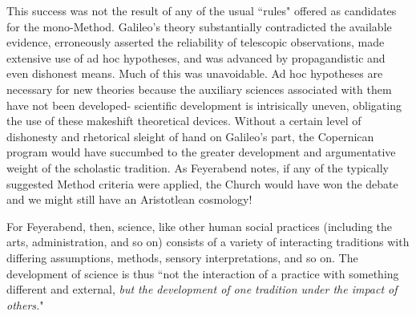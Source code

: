 This success was not the result of any of the usual ``rules" offered as candidates for the mono-Method. Galileo's theory substantially contradicted the available evidence, erroneously asserted the reliability of telescopic observations, made extensive use of ad hoc hypotheses, and was advanced by propagandistic and even dishonest means. Much of this was unavoidable. Ad hoc hypotheses are necessary for new theories because the auxiliary sciences associated with them have not been developed- scientific development is intrisically uneven, obligating the use of these makeshift theoretical devices. Without a certain level of dishonesty and rhetorical sleight of hand on Galileo's part, the Copernican program would have succumbed to the greater development and argumentative weight of the scholastic tradition. As Feyerabend notes, if any of the typically suggested Method criteria were applied, the Church would have won the debate and we might still have an Aristotlean cosmology!

For Feyerabend, then, science, like other human social practices (including the arts, administration, and so on) consists of a variety of interacting traditions with differing assumptions, methods, sensory interpretations, and so on. The development of science is thus ``not the interaction of a practice with something different and external, \textit{but the development of one tradition under the impact of others.}" \cite[p.232]{Feyerabend1993}

